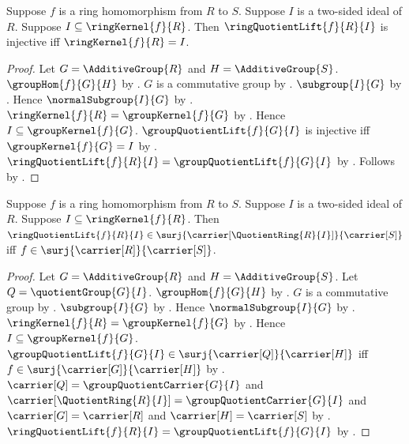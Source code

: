 \begin{theorem}\label{ring_quotient_lift_injective_iff}
    Suppose $f$ is a ring homomorphism from $R$ to $S$.
    Suppose $I$ is a two-sided ideal of $R$.
    Suppose $I\subseteq\ringKernel{f}{R}$.
    Then $\ringQuotientLift{f}{R}{I}$ is injective iff
        $\ringKernel{f}{R}=I$.
\end{theorem}
\begin{proof}
    Let $G=\AdditiveGroup{R}$ and $H=\AdditiveGroup{S}$.
    $\groupHom{f}{G}{H}$ by
        .
    $G$ is a commutative group by
        .
    $\subgroup{I}{G}$ by
        .
    Hence $\normalSubgroup{I}{G}$ by
        .
    $\ringKernel{f}{R}=\groupKernel{f}{G}$ by .
    Hence $I\subseteq\groupKernel{f}{G}$.
    $\groupQuotientLift{f}{G}{I}$ is injective iff
        $\groupKernel{f}{G}=I$ by
        .
    $\ringQuotientLift{f}{R}{I}=\groupQuotientLift{f}{G}{I}$ by
        .
    Follows by \auto.
\end{proof}

\begin{theorem}\label{ring_quotient_lift_surjective_iff}
    Suppose $f$ is a ring homomorphism from $R$ to $S$.
    Suppose $I$ is a two-sided ideal of $R$.
    Suppose $I\subseteq\ringKernel{f}{R}$.
    Then
        $\ringQuotientLift{f}{R}{I}\in
            \surj{\carrier[\QuotientRing{R}{I}]}{\carrier[S]}$
        iff $f\in\surj{\carrier[R]}{\carrier[S]}$.
\end{theorem}
\begin{proof}
    Let $G=\AdditiveGroup{R}$ and $H=\AdditiveGroup{S}$.
    Let $Q=\quotientGroup{G}{I}$.
    $\groupHom{f}{G}{H}$ by
        .
    $G$ is a commutative group by
        .
    $\subgroup{I}{G}$ by
        .
    Hence $\normalSubgroup{I}{G}$ by
        .
    $\ringKernel{f}{R}=\groupKernel{f}{G}$ by .
    Hence $I\subseteq\groupKernel{f}{G}$.
    $\groupQuotientLift{f}{G}{I}\in
        \surj{\carrier[Q]}{\carrier[H]}$ iff
        $f\in\surj{\carrier[G]}{\carrier[H]}$ by
        .
    $\carrier[Q]=\groupQuotientCarrier{G}{I}$ and
        $\carrier[\QuotientRing{R}{I}]=\groupQuotientCarrier{G}{I}$ and
        $\carrier[G]=\carrier[R]$ and $\carrier[H]=\carrier[S]$ by
        .
    $\ringQuotientLift{f}{R}{I}=\groupQuotientLift{f}{G}{I}$ by
        .
\end{proof}
